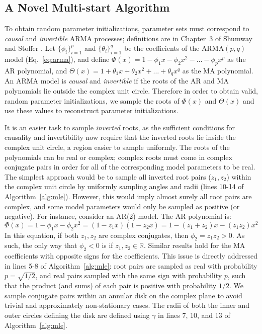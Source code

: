 \subsection{A Novel Multi-start Algorithm}

To obtain random parameter initializations, parameter sets must
correspond to \emph{causal} and \emph{invertible} ARMA processes;
definitions are in Chapter~3 of Shumway and Stoffer \cite{shumway2017}.
Let $\{\phi_i\}_{i = 1}^p$ and $\{\theta_i\}_{i = 1}^q$ be the coefficients of the $\text{ARMA}(p, q)$ model (Eq.~\ref{eq:arma}), and define $\Phi(x) = 1 - \phi_1 x - \phi_2x^2 - \ldots - \phi_px^p$ as the AR polynomial, and $\Theta(x) = 1 + \theta_1 x + \theta_2x^2 + \ldots + \theta_qx^q$ as the MA polynomial.
An ARMA model is \emph{causal} and \emph{invertible} if the roots of the AR and MA polynomials lie outside the complex unit circle.
Therefore in order to obtain valid, random parameter initializations, we sample the roots of $\Phi(x)$ and $\Theta(x)$ and use these values to reconstruct parameter initializations.

It is an easier task to sample \emph{inverted} roots, as the sufficient conditions for causality and invertibility now require that the inverted roots lie inside the complex unit circle, a region easier to sample uniformly.
The roots of the polynomials can be real or complex; complex roots must come in complex conjugate pairs in order for all of the corresponding model parameters to be real.
The simplest approach would be to sample all inverted root pairs ($z_1, z_2$) within the complex unit circle by uniformly sampling angles and radii (lines 10-14 of Algorithm~\ref{alg:mle}).
However, this would imply almost surely all root pairs are complex, and some model parameters would only be sampled as positive (or negative).
For instance, consider an AR(2) model.
The AR polynomial is:
$$
\Phi(x) = 1-\phi_1x - \phi_2x^2 = (1 - z_1x)(1 - z_2x) = 1 - (z_1 + z_2)x - (z_1z_2)x^2
$$
In this equation, if both $z_1, z_2$ are complex conjugates, then $\phi_2 = z_1z_2 > 0$.
As such, the only way that $\phi_2 < 0$ is if $z_1, z_2 \in \mathbb{R}$.
Similar results hold for the MA coefficients with opposite signs for the coefficients.
This issue is directly addressed in lines 5-8 of Algorithm~\ref{alg:mle}:
root pairs are sampled as real with probability $p = \sqrt{1/2}$, and real pairs sampled with the same sign with probability $p$, such that the product (and sums) of each pair is positive with probability $1/2$.
We sample conjugate pairs within an annular disk on the complex plane to avoid trivial and approximately non-stationary cases.
The radii of both the inner and outer circles defining the disk are defined using $\gamma$ in lines 7, 10, and 13 of Algorithm~\ref{alg:mle}.

